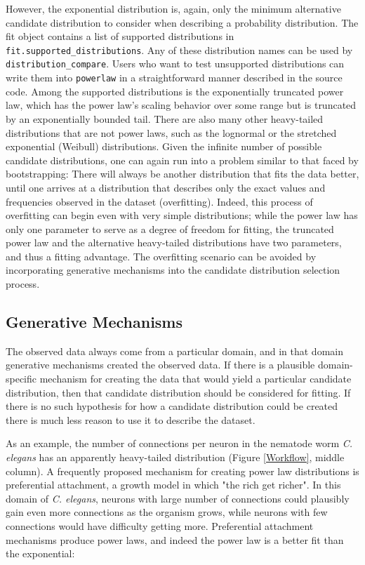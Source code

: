 \documentclass[10pt]{article}
\begin{document}
However, the exponential distribution is, again, only the minimum alternative candidate distribution to consider when describing a probability distribution. The fit object contains a list of supported distributions in \verb$fit.supported_distributions$. Any of these distribution names can be used by \verb$distribution_compare$. Users who want to test unsupported distributions can write them into \verb$powerlaw$ in a straightforward manner described in the source code. Among the supported distributions is the exponentially truncated power law, which has the power law's scaling behavior over some range but is truncated by an exponentially bounded tail. There are also many other heavy-tailed distributions that are not power laws, such as the lognormal or the stretched exponential (Weibull) distributions. Given the infinite number of possible candidate distributions, one can again run into a problem similar to that faced by bootstrapping: There will always be another distribution that fits the data better, until one arrives at a distribution that describes only the exact values and frequencies observed in the dataset (overfitting). Indeed, this process of overfitting can begin even with very simple distributions; while the power law has only one parameter to serve as a degree of freedom for fitting, the truncated power law and the alternative heavy-tailed distributions have two parameters, and thus a fitting advantage.  The overfitting scenario can be avoided by incorporating generative mechanisms into the candidate distribution selection process.

\subsection*{Generative Mechanisms}
The observed data always come from a particular domain, and in that domain generative mechanisms created the observed data. If there is a plausible domain-specific mechanism for creating the data that would yield a particular candidate distribution, then that candidate distribution should be considered for fitting. If there is no such hypothesis for how a candidate distribution could be created there is much less reason to use it to describe the dataset. 

As an example, the number of connections per neuron in the nematode worm \textit{C. elegans} has an apparently heavy-tailed distribution (Figure \ref{Workflow}, middle column). A frequently proposed mechanism for creating power law distributions is preferential attachment, a growth model in which "the rich get richer". In this domain of \textit{C. elegans}, neurons with large number of connections could plausibly gain even more connections as the organism grows, while neurons with few connections would have difficulty getting more. Preferential attachment mechanisms produce power laws, and indeed the power law is a better fit than the exponential:
\end{document}
